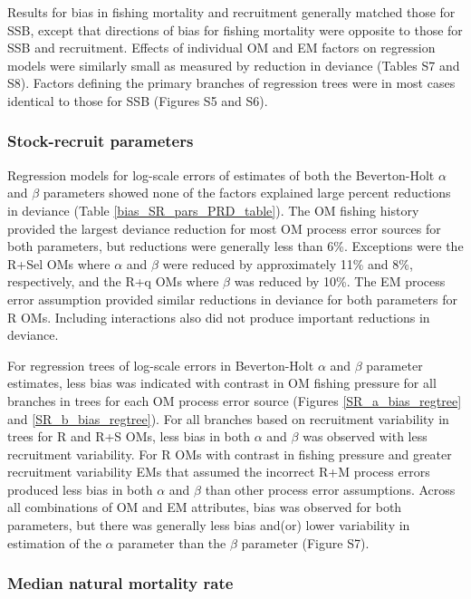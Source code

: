 \documentclass[
  12pt,
]{article}
\begin{document}
Results for bias in fishing mortality and recruitment generally matched
those for SSB, except that directions of bias for fishing mortality were
opposite to those for SSB and recruitment. Effects of individual OM and
EM factors on regression models were similarly small as measured by
reduction in deviance (Tables S7 and S8). Factors defining the primary
branches of regression trees were in most cases identical to those for
SSB (Figures S5 and S6).

\subsubsection*{Stock-recruit
parameters}\label{stock-recruit-parameters}

Regression models for log-scale errors of estimates of both the
Beverton-Holt \(\alpha\) and \(\beta\) parameters showed none of the
factors explained large percent reductions in deviance (Table
\ref{bias_SR_pars_PRD_table}). The OM fishing history provided the
largest deviance reduction for most OM process error sources for both
parameters, but reductions were generally less than 6\%. Exceptions were
the R+Sel OMs where \(\alpha\) and \(\beta\) were reduced by
approximately 11\% and 8\%, respectively, and the R+q OMs where
\(\beta\) was reduced by 10\%. The EM process error assumption provided
similar reductions in deviance for both parameters for R OMs. Including
interactions also did not produce important reductions in deviance.

For regression trees of log-scale errors in Beverton-Holt \(\alpha\) and
\(\beta\) parameter estimates, less bias was indicated with contrast in
OM fishing pressure for all branches in trees for each OM process error
source (Figures \ref{SR_a_bias_regtree} and \ref{SR_b_bias_regtree}).
For all branches based on recruitment variability in trees for R and R+S
OMs, less bias in both \(\alpha\) and \(\beta\) was observed with less
recruitment variability. For R OMs with contrast in fishing pressure and
greater recruitment variability EMs that assumed the incorrect R+M
process errors produced less bias in both \(\alpha\) and \(\beta\) than
other process error assumptions. Across all combinations of OM and EM
attributes, bias was observed for both parameters, but there was
generally less bias and(or) lower variability in estimation of the
\(\alpha\) parameter than the \(\beta\) parameter (Figure S7).

\subsubsection*{Median natural mortality
rate}\label{median-natural-mortality-rate}
\end{document}
